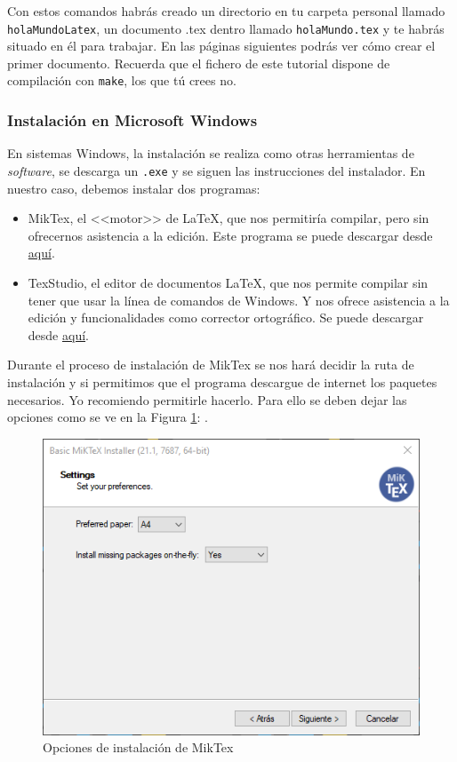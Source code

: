 \documentclass[]{article}
\begin{document}
Con estos comandos habrás creado un directorio en tu carpeta personal llamado
\texttt{holaMundoLatex}, un documento .tex dentro llamado \texttt{holaMundo.tex}
y te habrás situado en él para trabajar. En las páginas siguientes podrás ver
cómo crear el primer documento. Recuerda que el fichero de este tutorial dispone
de compilación con \texttt{make}, los que tú crees no.

\subsubsection{Instalación en Microsoft Windows}
En sistemas Windows, la instalación se realiza como otras herramientas de
\textit{software}, se descarga un \texttt{.exe} y se siguen las instrucciones
del instalador. En nuestro caso, debemos instalar dos programas:
\begin{itemize}
    \item MikTex, el <<motor>> de \LaTeX{}, que nos permitiría compilar,
         pero sin ofrecernos asistencia a la edición.
        Este programa se puede descargar desde
         \href{https://miktex.org/download}{aquí}. 
    \item TexStudio, el editor de documentos \LaTeX{}, que nos permite compilar
        sin tener que usar la línea de comandos de Windows. Y nos ofrece
        asistencia a la edición y funcionalidades como corrector ortográfico.
        Se puede descargar desde \href{https://www.texstudio.org/}{aquí}.
\end{itemize}

Durante el proceso de
instalación de MikTex se nos hará decidir la ruta de instalación y si permitimos
que el programa descargue de internet los paquetes necesarios. Yo
recomiendo permitirle hacerlo. Para ello se deben dejar las opciones como
se ve en la Figura \ref{fig:miktex}: .
\begin{figure}[H]
    \center
    \includegraphics[width=0.75\hsize]{miktexInstall}
    \caption{Opciones de instalación de MikTex}
    \label{fig:miktex}
\end{figure}
\end{document}
